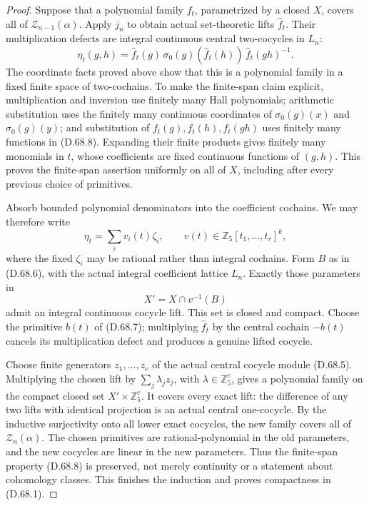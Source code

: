 \begin{proof}
Suppose that a polynomial family \(f_t\),
parametrized by a closed \(X\), covers all
of \(\mathscr Z_{n-1}(\alpha)\). Apply \(j_n\)
to obtain actual set-theoretic lifts \(\widehat f_t\).
Their multiplication defects are integral
continuous central two-cocycles in \(L_n\):
\[
 \eta_t(g,h)=\widehat f_t(g)\,
        \sigma_0(g)(\widehat f_t(h))\,
                   \widehat f_t(gh)^{-1}.
                                                        \tag{D.68.9}
\]
The coordinate facts proved above show that
this is a polynomial family in a fixed finite
space of two-cochains. To make the finite-span
claim explicit, multiplication and inversion
use finitely many Hall polynomials; arithmetic
substitution uses the finitely many continuous
coordinates of \(\sigma_0(g)(x)\) and
\(\sigma_0(g)(y)\); and substitution of
\(f_t(g),f_t(h),f_t(gh)\) uses finitely many
functions in (D.68.8). Expanding their finite
products gives finitely many monomials in
\(t\), whose coefficients are fixed continuous
functions of \((g,h)\). This proves the
finite-span assertion uniformly on all of \(X\),
including after every previous choice of
primitives.

Absorb bounded polynomial denominators into
the coefficient cochains. We may therefore
write
\[
                 \eta_t=\sum_i v_i(t)\zeta_i,
       \qquad v(t)\in\mathbb Z_5[t_1,\ldots,t_r]^k,
                                                        \tag{D.68.10}
\]
where the fixed \(\zeta_i\) may be rational
rather than integral cochains. Form \(B\) as
in (D.68.6), with the actual integral coefficient
lattice \(L_n\). Exactly those parameters in
\[
                         X'=X\cap v^{-1}(B)
                                                        \tag{D.68.11}
\]
admit an integral continuous cocycle lift.
This set is closed and compact. Choose the
primitive \(b(t)\) of (D.68.7); multiplying
\(\widehat f_t\) by the central cochain
\(-b(t)\) cancels its multiplication defect
and produces a genuine lifted cocycle.

Choose finite generators \(z_1,\ldots,z_e\)
of the actual central cocycle module (D.68.5).
Multiplying the chosen lift by
\(\sum_j\lambda_j z_j\), with
\(\lambda\in\mathbb Z_5^e\), gives a
polynomial family on the compact closed set
\(X'\times\mathbb Z_5^e\). It covers every
exact lift: the difference of any two lifts
with identical projection is an actual central
one-cocycle. By the inductive surjectivity onto
all lower exact cocycles, the new family covers
all of \(\mathscr Z_n(\alpha)\).
The chosen primitives are rational-polynomial
in the old parameters, and the new cocycles
are linear in the new parameters. Thus the
finite-span property (D.68.8) is preserved,
not merely continuity or a statement about
cohomology classes. This finishes the induction
and proves compactness in (D.68.1).


\end{proof}
